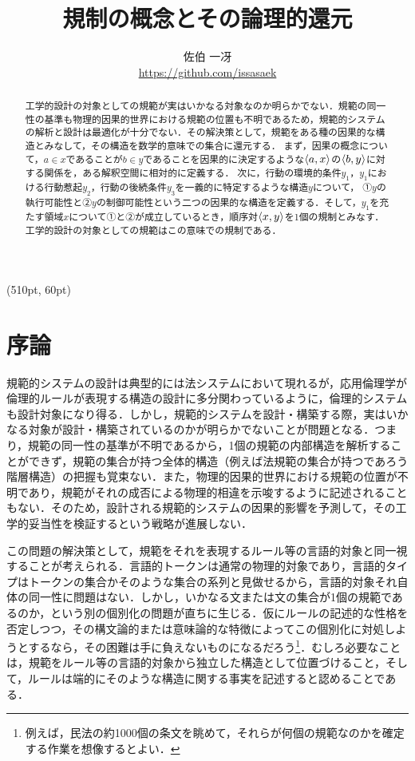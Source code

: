 
\begin{textblock*}{0.1\linewidth}(510pt, 60pt)
    \small \version
\end{textblock*}

\title{規制の概念とその論理的還元}
\author{佐伯 一冴\\\small\url{https://github.com/issasaek}}
\date{}
\maketitle

\begin{abstract}
工学的設計の対象としての規範が実はいかなる対象なのか明らかでない．規範の同一性の基準も物理的因果的世界における規範の位置も不明であるため，規範的システムの解析と設計は最適化が十分でない．その解決策として，規範をある種の因果的な構造とみなして，その構造を数学的意味での集合に還元する．
まず，因果の概念について，$a\in x$であることが$b\in y$であることを因果的に決定するような$\langle a,x \rangle$の$\langle b,y \rangle$に対する関係を，ある解釈空間に相対的に定義する．
次に，行動の環境的条件$y_1$，$y_1$における行動惹起$y_2$，行動の後続条件$y_3$を一義的に特定するような構造$y$について，
①$y$の執行可能性と②$y$の制御可能性という二つの因果的な構造を定義する．そして，$y_1$を充たす領域$x$について①と②が成立しているとき，順序対$\langle x,y \rangle$を1個の規制とみなす．工学的設計の対象としての規範はこの意味での規制である．
\end{abstract}

\section{序論}

規範的システムの設計は典型的には法システムにおいて現れるが，応用倫理学が倫理的ルールが表現する構造の設計に多分関わっているように，倫理的システムも設計対象になり得る．しかし，規範的システムを設計・構築する際，実はいかなる対象が設計・構築されているのかが明らかでないことが問題となる．つまり，規範の同一性の基準が不明であるから，1個の規範の内部構造を解析することができず，規範の集合が持つ全体的構造（例えば法規範の集合が持つであろう階層構造）の把握も覚束ない．また，物理的因果的世界における規範の位置が不明であり，規範がそれの成否による物理的相違を示唆するように記述されることもない．そのため，設計される規範的システムの因果的影響を予測して，その工学的妥当性を検証するという戦略が進展しない．

この問題の解決策として，規範をそれを表現するルール等の言語的対象と同一視することが考えられる．言語的トークンは通常の物理的対象であり，言語的タイプはトークンの集合かそのような集合の系列と見做せるから，言語的対象それ自体の同一性に問題はない．しかし，いかなる文または文の集合が1個の規範であるのか，という別の個別化の問題が直ちに生じる．仮にルールの記述的な性格を否定しつつ，その構文論的または意味論的な特徴によってこの個別化に対処しようとするなら，その困難は手に負えないものになるだろう\footnote{例えば，民法の約1000個の条文を眺めて，それらが何個の規範なのかを確定する作業を想像するとよい．}．むしろ必要なことは，規範をルール等の言語的対象から独立した構造として位置づけること，そして，ルールは端的にそのような構造に関する事実を記述すると認めることである．

